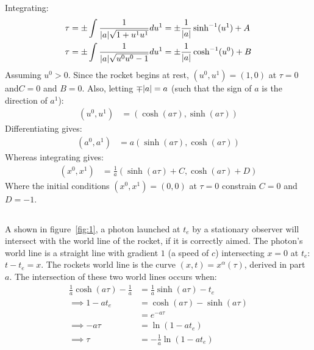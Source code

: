 \documentclass[a4paper]{article}
\begin{document}
Integrating:
\begin{align*}
\tau &= \pm \int \frac{1}{\abs{a}\sqrt{1 + u^1 u^1}} du^1 = \pm \frac{1}{\abs{a}}\sinh^{-1}(u^1) + A\\
\tau &= \pm \int \frac{1}{\abs{a}\sqrt{u^0 u^0 - 1}} du^1 = \pm \frac{1}{\abs{a}}\cosh^{-1}(u^0) + B
\end{align*}
Assuming $u^0 > 0$. Since the rocket begins at rest, $(u^0, u^1) = (1, 0)$ at $\tau = 0$ and$C = 0$ and $B = 0$. Also, letting $\mp \abs{a} = a$ (such that the sign of $a$ is the direction of $a^1$):
\begin{align*}
(u^0, u^1) &= (\cosh(a \tau), \sinh(a\tau))
\end{align*}
Differentiating gives:
\begin{align*}
	(a^0, a^1) &= a(\sinh(a \tau), \cosh(a\tau))
\end{align*}
Whereas integrating gives:
\begin{align*}
	(x^0, x^1) &= \frac{1}{a}(\sinh(a \tau) + C, \cosh(a\tau) + D)
\end{align*}
Where the initial conditions $(x^0, x^1) = (0, 0)$ at $\tau = 0$ constrain $C = 0$ and $D = -1$.



\subsection{}
A shown in figure~\ref{fig:1}, a photon launched at $t_e$ by a stationary observer will intersect with the world line of the rocket, if it is correctly aimed. 
The photon's world line is a straight line with gradient $1$ (a speed of $c$) intersecting $x=0$ at $t_e$: $t -  t_e = x$.
The rockets world line is the curve $(x, t) = x^\alpha(\tau)$, derived in part $a$.
The intersection of these two world lines occurs when:
\begin{align*}
	\frac{1}{a}\cosh(a\tau) - \frac{1}{a} &= \frac{1}{a} \sinh(a\tau) - t_e\\
	\implies 1-at_e &= \cosh(a\tau) - \sinh(a\tau) \\
	&= e^{-a \tau}\\
	\implies -a \tau &= \ln(1-at_e)\\
	\implies \tau &= -\frac{1}{a} \ln(1-at_e)\\
\end{align*}






\end{document}
